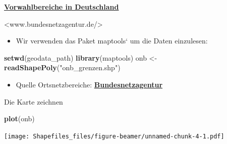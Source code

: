 \documentclass[ignorenonframetext,]{beamer}
\newenvironment{Shaded}{\begin{snugshade}}{\end{snugshade}}
\newcommand{\KeywordTok}[1]{\textcolor[rgb]{0.13,0.29,0.53}{\textbf{#1}}}
\newcommand{\StringTok}[1]{\textcolor[rgb]{0.31,0.60,0.02}{#1}}
\newcommand{\NormalTok}[1]{#1}
\providecommand{\tightlist}{%
  \setlength{\itemsep}{0pt}\setlength{\parskip}{0pt}}
\begin{document}
\begin{frame}[fragile]{\href{http://www.bundesnetzagentur.de/SharedDocs/Downloads/DE/Sachgebiete/Telekommunikation/Unternehmen_Institutionen/Nummerierung/Rufnummern/ONVerzeichnisse/ONBGrenzen/ONB_Grenzen.html}{\textbf{Vorwahlbereiche
in Deutschland}}}

\begin{block}{\textless{}www.bundesnetzagentur.de/\textgreater{}}

\begin{itemize}
\tightlist
\item
  Wir verwenden das Paket maptools` um die Daten einzulesen:
\end{itemize}

\begin{Shaded}
\begin{Highlighting}[]
\KeywordTok{setwd}\NormalTok{(geodata_path)}
\KeywordTok{library}\NormalTok{(maptools)}
\NormalTok{onb <-}\StringTok{ }\KeywordTok{readShapePoly}\NormalTok{(}\StringTok{"onb_grenzen.shp"}\NormalTok{)}
\end{Highlighting}
\end{Shaded}

\begin{itemize}
\tightlist
\item
  Quelle Ortsnetzbereiche:
  \href{http://www.bundesnetzagentur.de/DE/Sachgebiete/Telekommunikation/Unternehmen_Institutionen/Nummerierung/Rufnummern/ONVerzeichnisse/GISDaten_ONBGrenzen/ONBGrenzen_Basepage.html}{\textbf{Bundesnetzagentur}}
\end{itemize}

\end{block}

\end{frame}

\begin{frame}[fragile]{Die Karte zeichnen}

\begin{Shaded}
\begin{Highlighting}[]
\KeywordTok{plot}\NormalTok{(onb)}
\end{Highlighting}
\end{Shaded}

\texttt{[image: Shapefiles\_files/figure-beamer/unnamed-chunk-4-1.pdf]}

\end{frame}
\end{document}
